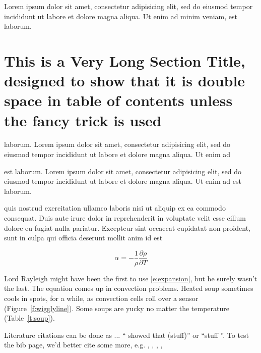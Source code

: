 Lorem ipsum dolor sit amet, consectetur adipisicing elit, sed do eiusmod tempor incididunt ut labore et dolore magna aliqua. Ut enim ad minim veniam,
est laborum.



\section{This is a Very Long Section Title, designed to show that it is double
space in table of contents unless the fancy trick is used}

laborum. Lorem ipsum dolor sit amet, consectetur adipisicing elit, sed do eiusmod tempor incididunt ut labore et dolore magna aliqua. Ut enim ad


est laborum. Lorem ipsum dolor sit amet, consectetur adipisicing elit, sed do eiusmod tempor incididunt ut labore et dolore magna aliqua. Ut enim ad
est laborum.


quis nostrud exercitation ullamco laboris nisi ut aliquip ex ea commodo consequat. Duis aute irure dolor in reprehenderit in voluptate velit esse
cillum dolore eu fugiat nulla pariatur. Excepteur sint occaecat cupidatat non proident, sunt in culpa qui officia deserunt mollit anim id est




\begin{equation}
	\label{e:expansion}
	\alpha = -\frac{1}{\rho}\frac{\partial \rho}{\partial T}
\end{equation}

Lord Rayleigh might have been the first to use \eqref{e:expansion}, but he surely wasn't the last. The equation comes up in
convection problems. Heated soup sometimes cools in spots, for a while, as convection cells roll over a sensor
(Figure~\ref{f:wigglyline}).  Some soups are yucky no matter the temperature (Table~\ref{t:soup}).

Literature citations can be done as ... ``\cite{Voss:2001} showed that (stuff)'' or 
``stuff \cite[]{Voss:2001}''.  To test the bib page, we'd
better cite some more, e.g. \cite{Baines:1973}, \cite{Baines:1982},
\cite{ostlund1981tldr}, 
\cite{boer1994raia},

